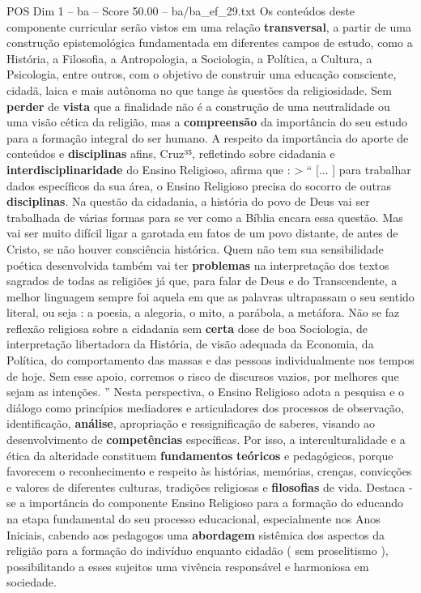 \begin{textsample}{POS Dim 1 – ba – Score 50.00 – ba/ba\_ef\_29.txt}
Os conteúdos deste componente curricular serão vistos em uma relação \textbf{transversal}, a partir de uma construção epistemológica fundamentada em diferentes campos de estudo, como a História, a Filosofia, a Antropologia, a Sociologia, a Política, a Cultura, a Psicologia, entre outros, com o objetivo de construir uma educação consciente, cidadã, laica e mais autônoma no que tange às questões da religiosidade.
Sem \textbf{perder} de \textbf{vista} que a finalidade não é a construção de uma neutralidade ou uma visão cética da religião, mas a \textbf{compreensão} da importância do seu estudo para a formação integral do ser humano.
A respeito da importância do aporte de conteúdos e \textbf{disciplinas} afins, Cruz³⁵, refletindo sobre cidadania e \textbf{interdisciplinaridade} do Ensino Religioso, afirma que : > “ [... ] para trabalhar dados específicos da sua área, o Ensino Religioso precisa do socorro de outras \textbf{disciplinas}.
Na questão da cidadania, a história do povo de Deus vai ser trabalhada de várias formas para se ver como a Bíblia encara essa questão.
Mas vai ser muito difícil ligar a garotada em fatos de um povo distante, de antes de Cristo, se não houver consciência histórica.
Quem não tem sua sensibilidade poética desenvolvida também vai ter \textbf{problemas} na interpretação dos textos sagrados de todas as religiões já que, para falar de Deus e do Transcendente, a melhor linguagem sempre foi aquela em que as palavras ultrapassam o seu sentido literal, ou seja : a poesia, a alegoria, o mito, a parábola, a metáfora.
Não se faz reflexão religiosa sobre a cidadania sem \textbf{certa} dose de boa Sociologia, de interpretação libertadora da História, de visão adequada da Economia, da Política, do comportamento das massas e das pessoas individualmente nos tempos de hoje.
Sem esse apoio, corremos o risco de discursos vazios, por melhores que sejam as intenções. ” Nesta perspectiva, o Ensino Religioso adota a pesquisa e o diálogo como princípios mediadores e articuladores dos processos de observação, identificação, \textbf{análise}, apropriação e ressignificação de saberes, visando ao desenvolvimento de \textbf{competências} específicas.
Por isso, a interculturalidade e a ética da alteridade constituem \textbf{fundamentos} \textbf{teóricos} e pedagógicos, porque favorecem o reconhecimento e respeito às histórias, memórias, crenças, convicções e valores de diferentes culturas, tradições religiosas e \textbf{filosofias} de vida.
Destaca -se a importância do componente Ensino Religioso para a formação do educando na etapa fundamental do seu processo educacional, especialmente nos Anos Iniciais, cabendo aos pedagogos uma \textbf{abordagem} sistêmica dos aspectos da religião para a formação do indivíduo enquanto cidadão ( sem proselitismo ), possibilitando a esses sujeitos uma vivência responsável e harmoniosa em sociedade.

\end{textsample}
